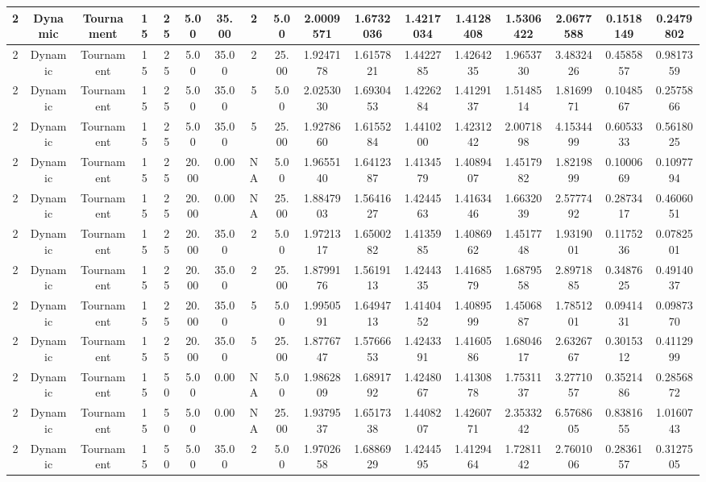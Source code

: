 \documentclass[a4paper]{article}
\begin{document}
\begin{center}
\begin{tabular}{ | c | c | c | c | c | c | c | c | c | c | c | c | c | c | c | c | c | }
		\hline
		2	&	Dynamic	&	Tournament	&	15	&	25	&	5.00	&	35.00	&	2	&	5.00	&	2.0009571	&	1.6732036	&	1.4217034	&	1.4128408	&	1.5306422	&	2.0677588	&	0.1518149	&	0.2479802 \\
		\hline
		2	&	Dynamic	&	Tournament	&	15	&	25	&	5.00	&	35.00	&	2	&	25.00	&	1.9247178	&	1.6157821	&	1.4422785	&	1.4264235	&	1.9653730	&	3.4832426	&	0.4585857	&	0.9817359 \\
		\hline
		2	&	Dynamic	&	Tournament	&	15	&	25	&	5.00	&	35.00	&	5	&	5.00	&	2.0253030	&	1.6930453	&	1.4226284	&	1.4129137	&	1.5148514	&	1.8169971	&	0.1048567	&	0.2575866 \\
		\hline
		2	&	Dynamic	&	Tournament	&	15	&	25	&	5.00	&	35.00	&	5	&	25.00	&	1.9278660	&	1.6155284	&	1.4410200	&	1.4231242	&	2.0071898	&	4.1534499	&	0.6053333	&	0.5618025 \\
		\hline
		2	&	Dynamic	&	Tournament	&	15	&	25	&	20.00	&	0.00	&	NA	&	5.00	&	1.9655140	&	1.6412387	&	1.4134579	&	1.4089407	&	1.4517982	&	1.8219899	&	0.1000669	&	0.1097794 \\
		\hline
		2	&	Dynamic	&	Tournament	&	15	&	25	&	20.00	&	0.00	&	NA	&	25.00	&	1.8847903	&	1.5641627	&	1.4244563	&	1.4163446	&	1.6632039	&	2.5777492	&	0.2873417	&	0.4606051 \\
		\hline
		2	&	Dynamic	&	Tournament	&	15	&	25	&	20.00	&	35.00	&	2	&	5.00	&	1.9721317	&	1.6500282	&	1.4135985	&	1.4086962	&	1.4517748	&	1.9319001	&	0.1175236	&	0.0782501 \\
		\hline
		2	&	Dynamic	&	Tournament	&	15	&	25	&	20.00	&	35.00	&	2	&	25.00	&	1.8799176	&	1.5619113	&	1.4244335	&	1.4168579	&	1.6879558	&	2.8971885	&	0.3487625	&	0.4914037 \\
		\hline
		2	&	Dynamic	&	Tournament	&	15	&	25	&	20.00	&	35.00	&	5	&	5.00	&	1.9950591	&	1.6494713	&	1.4140452	&	1.4089599	&	1.4506887	&	1.7851201	&	0.0941431	&	0.0987370 \\
		\hline
		2	&	Dynamic	&	Tournament	&	15	&	25	&	20.00	&	35.00	&	5	&	25.00	&	1.8776747	&	1.5766653	&	1.4243391	&	1.4160586	&	1.6804617	&	2.6326767	&	0.3015312	&	0.4112999 \\
		\hline
		2	&	Dynamic	&	Tournament	&	15	&	50	&	5.00	&	0.00	&	NA	&	5.00	&	1.9862809	&	1.6891792	&	1.4248067	&	1.4130878	&	1.7531137	&	3.2771057	&	0.3521486	&	0.2856872 \\
		\hline
		2	&	Dynamic	&	Tournament	&	15	&	50	&	5.00	&	0.00	&	NA	&	25.00	&	1.9379537	&	1.6517338	&	1.4408207	&	1.4260771	&	2.3533242	&	6.5768605	&	0.8381655	&	1.0160743 \\
		\hline
		2	&	Dynamic	&	Tournament	&	15	&	50	&	5.00	&	35.00	&	2	&	5.00	&	1.9702658	&	1.6886929	&	1.4244595	&	1.4129464	&	1.7281142	&	2.7601006	&	0.2836157	&	0.3127505 \\

\end{tabular}
\end{center}
\end{document}
